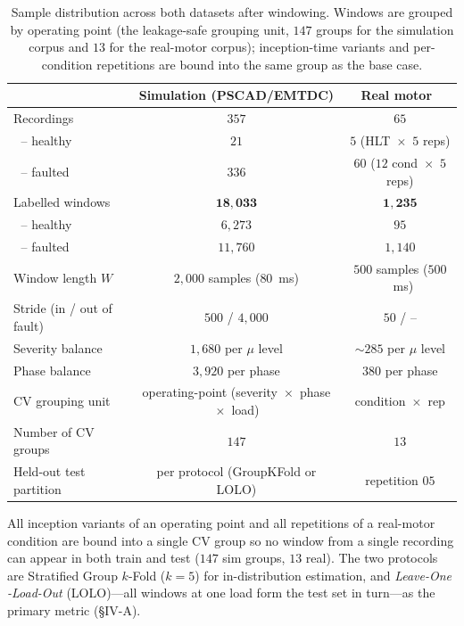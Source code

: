 \documentclass[journal]{IEEEtran}
\begin{document}
\begin{table}[!t]
\caption{Sample distribution across both datasets after windowing. Windows are grouped by
operating point (the leakage-safe grouping unit, $147$ groups for the simulation corpus and
$13$ for the real-motor corpus); inception-time variants and per-condition repetitions are
bound into the same group as the base case.}
\label{tab:samples}
\centering
\footnotesize
\begin{tabular}{@{}lcc@{}}
\toprule
& Simulation (PSCAD/EMTDC) & Real motor~\cite{ibarram} \\
\midrule
Recordings & $357$ & $65$ \\
$\;$ -- healthy & $21$ & $5$ (HLT $\!\times\!$ $5$ reps) \\
$\;$ -- faulted & $336$ & $60$ ($12$ cond $\!\times\!$ $5$ reps) \\
Labelled windows & $\mathbf{18{,}033}$ & $\mathbf{1{,}235}$ \\
$\;$ -- healthy & $6{,}273$ & $95$ \\
$\;$ -- faulted & $11{,}760$ & $1{,}140$ \\
Window length $W$ & $2{,}000$ samples ($80$~ms) & $500$ samples ($500$~ms) \\
Stride (in / out of fault) & $500$ / $4{,}000$ & $50$ / -- \\
Severity balance & $1{,}680$ per $\mu$ level & $\sim 285$ per $\mu$ level \\
Phase balance & $3{,}920$ per phase & $380$ per phase \\
CV grouping unit & operating-point (severity $\!\times\!$ phase $\!\times\!$ load) & condition $\!\times\!$ rep \\
Number of CV groups & $147$ & $13$ \\
Held-out test partition & per protocol (GroupKFold or LOLO) & repetition $05$ \\
\bottomrule
\end{tabular}
\end{table}

All inception variants of an operating point and all repetitions of a real-motor
condition are bound into a single CV group so no window from a single recording can
appear in both train and test ($147$ sim groups, $13$ real). The two protocols are
Stratified Group $k$-Fold ($k{=}5$) for in-distribution estimation, and \emph{Leave-One
-Load-Out} (LOLO)---all windows at one load form the test set in turn---as the primary
metric (\S IV-A).
\end{document}
